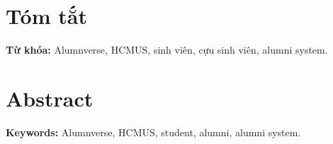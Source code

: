 \chapter*{Tóm tắt}


\vspace{1em}
\textbf{Từ khóa:} Alumnverse, HCMUS, sinh viên, cựu sinh viên, alumni system.

\clearpage
\chapter*{Abstract}


\vspace{1em}
\textbf{Keywords:} Alumnverse, HCMUS, student, alumni, alumni system.
